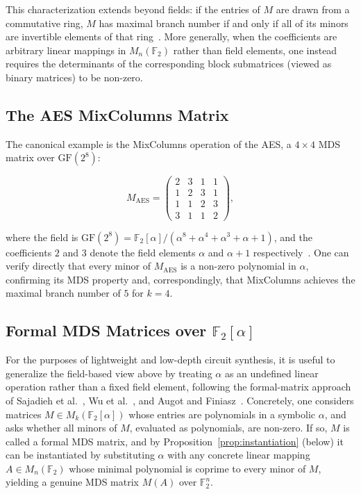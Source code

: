 This characterization extends beyond fields: if the entries of $M$ are drawn
from a commutative ring, $M$ has maximal branch number if and only if all of
its minors are invertible elements of that ring~\cite{augot2013exhaustive}. More generally,
when the coefficients are arbitrary linear mappings in $M_n(\mathbb{F}_2)$
rather than field elements, one instead requires the determinants of the
corresponding block submatrices (viewed as binary matrices) to be non-zero.

\subsection{The AES MixColumns Matrix}

The canonical example is the MixColumns operation of the AES, a $4\times 4$ MDS
matrix over $\mathrm{GF}(2^8)$:

\begin{equation}
M_{\mathrm{AES}} =
\begin{pmatrix}
2 & 3 & 1 & 1 \\
1 & 2 & 3 & 1 \\
1 & 1 & 2 & 3 \\
3 & 1 & 1 & 2
\end{pmatrix},
\end{equation}

where the field is $\mathrm{GF}(2^8) = \mathbb{F}_2[\alpha]/(\alpha^8 + \alpha^4 +
\alpha^3 + \alpha + 1)$, and the coefficients $2$ and $3$ denote the field
elements $\alpha$ and $\alpha+1$ respectively~\cite{daemen2002design}. One can verify
directly that every minor of $M_{\mathrm{AES}}$ is a non-zero polynomial in
$\alpha$, confirming its MDS property and, correspondingly, that MixColumns
achieves the maximal branch number of $5$ for $k=4$.

\subsection{Formal MDS Matrices over $\mathbb{F}_2[\alpha]$}

For the purposes of lightweight and low-depth circuit synthesis, it is useful to
generalize the field-based view above by treating $\alpha$ as an
undefined linear operation rather than a fixed field element, following
the formal-matrix approach of Sajadieh et al.~\cite{sajadieh2012recursive}, Wu et al.~\cite{ciphers2013recursive},
and Augot and Finiasz~\cite{augot2013exhaustive}. Concretely, one considers matrices $M \in
M_k(\mathbb{F}_2[\alpha])$ whose entries are polynomials in a symbolic
$\alpha$, and asks whether all minors of $M$, evaluated as polynomials, are
non-zero. If so, $M$ is called a formal MDS matrix, and by
Proposition~\ref{prop:instantiation} (below) it can be instantiated by
substituting $\alpha$ with any concrete linear mapping $A \in M_n(\mathbb{F}_2)$
whose minimal polynomial is coprime to every minor of $M$, yielding a genuine
MDS matrix $M(A)$ over $\mathbb{F}_2^n$.

